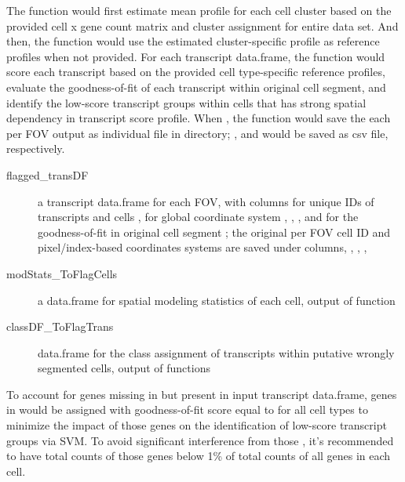 \documentclass[letterpaper]{book}
\begin{document}
\begin{Details}
The function would first estimate mean profile for each cell cluster based on the provided cell x gene count matrix and cluster assignment for entire data set.
And then, the function would use the estimated cluster-specific profile as reference profiles when not provided.
For each transcript data.frame, the function would score each transcript based on the provided cell type-specific reference profiles, evaluate the goodness-of-fit of each transcript within original cell segment, and identify the low-score transcript groups within cells that has strong spatial dependency in transcript score profile.
When , the function would save the each per FOV output as individual file in  directory; ,  and  would be saved as csv file, respectively.
\begin{description}

\item[flagged\_transDF] a transcript data.frame for each FOV, with columns for unique IDs of transcripts  and cells , for global coordinate system , , , and for the goodness-of-fit in original cell segment ; the original per FOV cell ID and pixel/index-based coordinates systems are saved under columns, , , , 
\item[modStats\_ToFlagCells] a data.frame for spatial modeling statistics of each cell, output of  function
\item[classDF\_ToFlagTrans] data.frame for the class assignment of transcripts within putative wrongly segmented cells, output of  functions

\end{description}


To account for genes missing in  but present in input transcript data.frame, genes in  would be assigned with goodness-of-fit score equal to  for all cell types to minimize the impact of those genes on the identification of low-score transcript groups via SVM. To avoid significant interference from those , it's recommended to have total counts of those genes below 1\% of total counts of all genes in each cell.
\end{Details}
\end{document}
